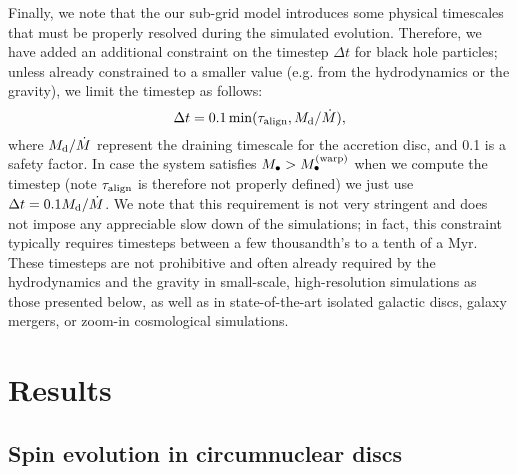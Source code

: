 \documentclass[a4paper,fleqn,usenatbib]{mnras}
\begin{document}
Finally, we note that the our sub-grid model introduces some physical timescales that must be properly resolved during the simulated evolution.
Therefore, we have added an additional constraint on the timestep $\Delta t$ for black hole particles; unless already constrained to a smaller value (e.g. from the hydrodynamics or the gravity), we limit the timestep as follows: 
\begin{equation}
\Delta t = 0.1 \min(\tau_{\rm align}, M_{\rm d} / \dot{M}),
\end{equation}
where $M_{\rm d} / \dot{M}$ represent the draining timescale for the accretion disc, and 0.1 is a safety factor.
In case the system satisfies $M_{\bullet} > M_{\bullet}^{\rm (warp)}$ when we compute the timestep (note $\tau_{\rm align}$ is therefore not properly defined) we just use $\Delta t = 0.1 M_{\rm d} / \dot{M}$.
We note that this requirement is not very stringent and does not impose any appreciable slow down of the simulations; in fact, this constraint typically requires timesteps between a few thousandth's to a tenth of a Myr.
These timesteps are not prohibitive and often already required by the hydrodynamics and the gravity in small-scale, high-resolution simulations as those presented below, as well as in state-of-the-art isolated galactic discs, galaxy mergers, or zoom-in cosmological simulations.


\section{Results} \label{sec_results}


\subsection{Spin evolution in circumnuclear discs} \label{subsec_cnd}
\end{document}
